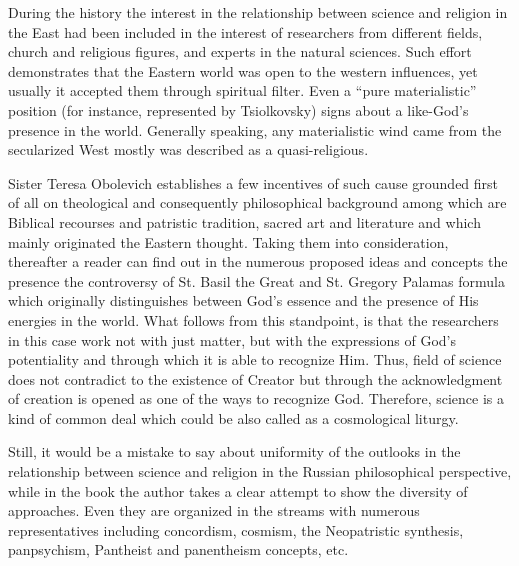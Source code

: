 \documentclass[a4paper]{article}
\begin{document}
{\color{black}
During the history the interest in the relationship between science and religion in the East had been included in the
interest of researchers from different fields, church and religious figures, and experts in the natural sciences. Such
effort demonstrates that the Eastern world was open to the western influences, yet usually it accepted them through
spiritual filter. Even a “pure materialistic” position (for instance, represented by Tsiolkovsky) signs about a
like-God’s presence in the world. Generally speaking, any materialistic wind came from the secularized West mostly was
described as a quasi-religious. }

{\color{black}
Sister Teresa Obolevich establishes a few incentives of such cause grounded first of all on theological and consequently
philosophical background among which are Biblical recourses and patristic tradition, sacred art and literature and
which mainly originated\textbf{ }the Eastern thought. Taking them into consideration, thereafter a reader can find out
in the numerous proposed ideas and concepts the presence the controversy of St. Basil the Great and St. Gregory Palamas
formula which originally distinguishes\textbf{ }between God’s essence and the presence of His energies in the world.
What follows from this standpoint, is that the researchers in this case work not with just matter, but with the
expressions of God’s potentiality and through which it is able to recognize Him. Thus, field of science does not
contradict to the existence of Creator but through the acknowledgment of creation is opened as one of the ways to
recognize God. Therefore, science is a kind of common deal which could be also called as a cosmological liturgy.}

{\color{black}
Still, it would be a mistake to say about uniformity of the outlooks in the relationship between science and religion in
the Russian philosophical perspective, while in the book the author takes a clear attempt to show the diversity of
approaches. Even they are organized in the streams with numerous representatives including concordism, cosmism, the
Neopatristic synthesis, panpsychism, Pantheist and panentheism concepts, etc. }
\end{document}
